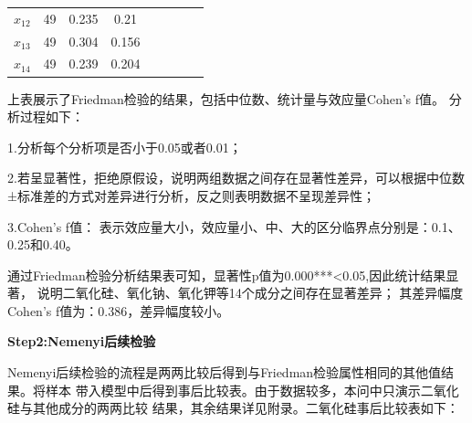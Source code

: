 \documentclass[UTF8]{ctexart}
\begin{document}
\begin{table}[H]
\begin{tabular}{|c|c|c|c|c|c|c|}
        $x_{12}$ & 49     & 0.235  & 0.21   & ~                         & ~                          & ~                       \\ \cline{1-4}
        $x_{13}$ & 49     & 0.304  & 0.156  & ~                         & ~                          & ~                       \\ \cline{1-4}
        $x_{14}$ & 49     & 0.239  & 0.204  & ~                         & ~                          & ~                       \\ \cline{1-4}
        \hline
    \end{tabular}
\end{table}

上表展示了Friedman检验的结果，包括中位数、统计量与效应量Cohen's f值。
分析过程如下：

1.分析每个分析项是否小于0.05或者0.01；

2.若呈显著性，拒绝原假设，说明两组数据之间存在显著性差异，可以根据中位数±标准差的方式对差异进行分析，反之则表明数据不呈现差异性；

3.Cohen's f值： 表示效应量大小，效应量小、中、大的区分临界点分别是：0.1、0.25和0.40。

通过Friedman检验分析结果表可知，显著性p值为0.000***<0.05,因此统计结果显著，
说明二氧化硅、氧化钠、氧化钾等14个成分之间存在显著差异；
其差异幅度Cohen's f值为：0.386，差异幅度较小。

\textbf{Step2:Nemenyi后续检验}

Nemenyi后续检验的流程是两两比较后得到与Friedman检验属性相同的其他值结果。将样本
带入模型中后得到事后比较表。由于数据较多，本问中只演示二氧化硅与其他成分的两两比较
结果，其余结果详见附录。二氧化硅事后比较表如下：
\end{document}
